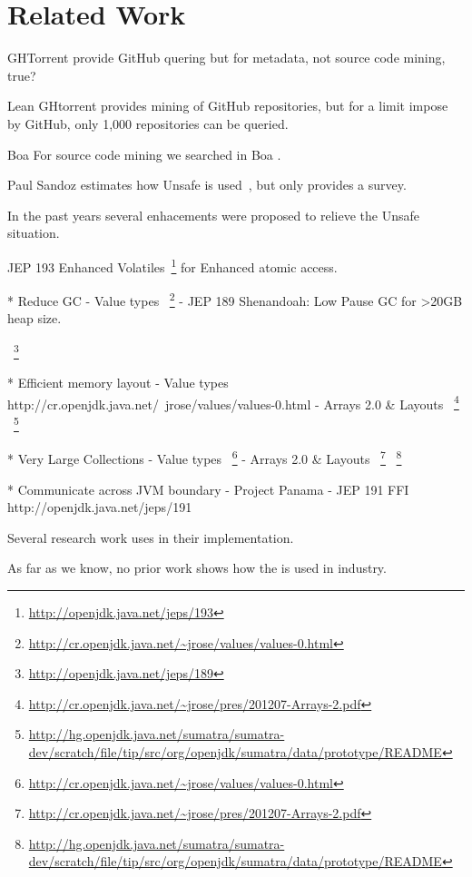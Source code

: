 
\section{Related Work} \label{sec:relatedwork}

GHTorrent \cite{Gousi13} provide GitHub quering but for metadata, not source code mining, true?

Lean GHtorrent \cite{GousiosMSR2014b} provides mining of GitHub repositories, but for a limit impose by GitHub, only 1,000 repositories can be queried.

Boa
For source code mining we searched in Boa \cite{Dyer-Nguyen-Rajan-Nguyen-13}. 


\cite{Dyer-Rajan-Nguyen-Nguyen-14}

Paul Sandoz estimates how Unsafe is used~\cite{psandoz14}, but only provides a survey.

In the past years several enhacements were proposed to relieve the Unsafe situation.

JEP 193 Enhanced Volatiles~\footnote{\url{http://openjdk.java.net/jeps/193}} for Enhanced atomic access.


* Reduce GC
  - Value types
    ~\footnote{\url{http://cr.openjdk.java.net/~jrose/values/values-0.html}}
  - JEP 189 Shenandoah: Low Pause GC for >20GB heap size.
  
    ~\footnote{\url{http://openjdk.java.net/jeps/189}}

* Efficient memory layout
  - Value types
    http://cr.openjdk.java.net/~jrose/values/values-0.html
  - Arrays 2.0 \& Layouts
    ~\footnote{\url{http://cr.openjdk.java.net/~jrose/pres/201207-Arrays-2.pdf}}
    ~\footnote{\url{http://hg.openjdk.java.net/sumatra/sumatra-dev/scratch/file/tip/src/org/openjdk/sumatra/data/prototype/README}}

* Very Large Collections
  - Value types
    ~\footnote{\url{http://cr.openjdk.java.net/~jrose/values/values-0.html}}
  - Arrays 2.0 \& Layouts
    ~\footnote{\url{http://cr.openjdk.java.net/~jrose/pres/201207-Arrays-2.pdf}}
    ~\footnote{\url{http://hg.openjdk.java.net/sumatra/sumatra-dev/scratch/file/tip/src/org/openjdk/sumatra/data/prototype/README}}

* Communicate across JVM boundary
  - Project Panama
  - JEP 191 FFI
    http://openjdk.java.net/jeps/191
    


Several research work uses \smu{} in their implementation.




As far as we know, no prior work shows how the \smu{} is used in industry.



